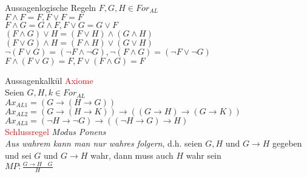 \begin{frame}{Aussagenlogische Regeln}
 $F,G,H\in For_{AL}$\\
 $F\wedge F=F,F\vee F=F$\\
 $F\wedge G=G\wedge F, F\vee G=G\vee F$\\
 $(F\wedge G)\vee H=(F\vee H)\wedge(G\wedge H)$\\
 $(F\vee G)\wedge H=(F\wedge H)\vee(G\vee H)$\\
 $\neg(F\vee G)=(\neg F\wedge\neg G), \neg(F\wedge G)=(\neg F\vee\neg G)$\\
 $F\wedge(F\vee G)=F, F\vee(F\wedge G)=F$\\
\end{frame}
\begin{frame}{Aussagenkalkül}
 \textcolor{red}{Axiome}\\
 Seien $G,H,k\in For_{AL}$\\
 $Ax_{AL1} = (G\rightarrow(H\rightarrow G))$\\
 $Ax_{AL2} = (G\rightarrow(H\rightarrow K))\rightarrow((G\rightarrow H)\rightarrow(G\rightarrow K))$\\
 $Ax_{AL3} = (\neg H\rightarrow\neg G)\rightarrow((\neg H\rightarrow G)\rightarrow H)$\\
 \textcolor{red}{Schlussregel} \emph{Modus Ponens}\\
 \emph{Aus wahrem kann man nur wahres folgern}, d.h. seien $G, H$ und $G\rightarrow H$ gegeben und sei $G$ und $G\rightarrow H$ wahr, dann muss auch $H$ wahr sein\\
 $MP : \frac{G\rightarrow H\quad G}{H}$\\
\end{frame}

